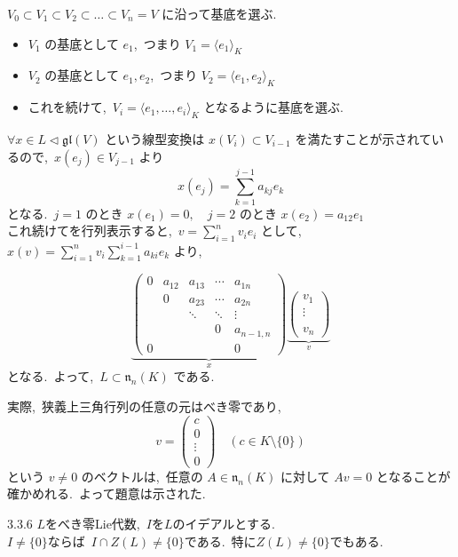 \documentclass[uplatex,dvipdfmx]{jsarticle}
\begin{document}
\begin{myproof}
$V_0 \subset V_1 \subset V_2 \subset \dots \subset V_n = V$ に沿って基底を選ぶ.~

\begin{itemize}
    \item $V_1$ の基底として $e_1$,~つまり $V_1 = \langle e_1 \rangle_K$
    \item $V_2$ の基底として $e_1, e_2$,~つまり $V_2 = \langle e_1, e_2 \rangle_K$
    \item これを続けて,~$V_i = \langle e_1, \dots, e_i \rangle_K$ となるように基底を選ぶ.~
\end{itemize}

$\forall x \in L \triangleleft \mathfrak{gl}(V)$ という線型変換は $x(V_i) \subset V_{i-1}$ を満たすことが示されているので,~$x(e_j) \in V_{j-1}$ より
\[
x(e_j) = \sum_{k=1}^{j-1} a_{kj} e_k
\]
となる.~$j=1 \text{ のとき } x(e_1) = 0, \quad j=2 \text{ のとき } x(e_2) = a_{12} e_1$\\
これ続けてを行列表示すると,~$v = \sum_{i=1}^n v_i e_i$ として,~$x(v) = \sum_{i=1}^n v_i \sum_{k=1}^{i-1} a_{ki} e_k$ より,~

\[
\underbrace{
\begin{pmatrix}
0 & a_{12} & a_{13} & \cdots & a_{1n} \\
  & 0      & a_{23} & \cdots & a_{2n} \\
  &        & \ddots & \ddots & \vdots \\
  &        &        & 0      & a_{n-1,n}      \\
0 &        &        &        & 0
\end{pmatrix}
}_{x}
\underbrace{
\begin{pmatrix}
v_1 \\
\vdots \\
\\
v_n
\end{pmatrix}
}_{v}
\]
となる.~よって,~$L \subset \mathfrak{n}_n(K)$ である.~

実際,~狭義上三角行列の任意の元はべき零であり,~
\[
v = \begin{pmatrix} c \\ 0 \\ \vdots \\ 0 \end{pmatrix} \quad (c \in K\setminus \{0\})
\]
という $v \neq 0$ のベクトルは,~任意の $A \in \mathfrak{n}_n(K)$ に対して $Av = 0$ となることが確かめれる.~よって題意は示された.
\end{myproof}
\newpage
\begin{mylemma}{3.3.6}
    $L$をべき零Lie代数,~$I$を$L$のイデアルとする.\\
    $I\neq \{0\}$ならば~$I \cap Z(L)\neq \{0\}$である.~特に$Z(L)\neq \{0\}$でもある.
\end{mylemma}
\end{document}
